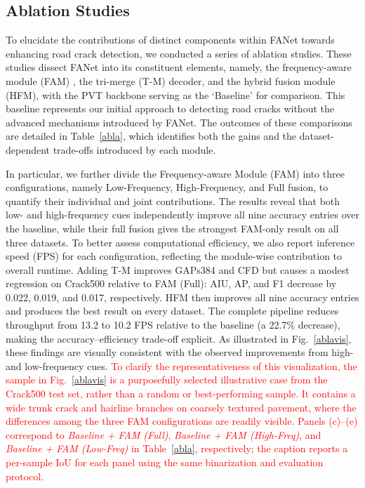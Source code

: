 \documentclass[journal]{IEEEtran}
\begin{document}
\subsection{Ablation Studies}
To elucidate the contributions of distinct components within FANet towards enhancing road crack detection, we conducted a series of ablation studies. These studies dissect FANet into its constituent elements, namely, the frequency-aware module (FAM) , the tri-merge (T-M) decoder, and the hybrid fusion module (HFM), with the PVT backbone serving as the `Baseline’ for comparison. This baseline represents our initial approach to detecting road cracks without the advanced mechanisms introduced by FANet. 
%
The outcomes of these comparisons are detailed in Table~\ref{abla}, which identifies both the gains and the dataset-dependent trade-offs introduced by each module.

In particular, we further divide the Frequency-aware Module (FAM) into three configurations, namely Low-Frequency, High-Frequency, and Full fusion, to quantify their individual and joint contributions.
The results reveal that both low- and high-frequency cues independently improve all nine accuracy entries over the baseline, while their full fusion gives the strongest FAM-only result on all three datasets.
To better assess computational efficiency, we also report inference speed (FPS) for each configuration, reflecting the module-wise contribution to overall runtime.
Adding T-M improves GAPs384 and CFD but causes a modest regression on Crack500 relative to FAM (Full): AIU, AP, and F1 decrease by 0.022, 0.019, and 0.017, respectively. HFM then improves all nine accuracy entries and produces the best result on every dataset. The complete pipeline reduces throughput from 13.2 to 10.2 FPS relative to the baseline (a 22.7\% decrease), making the accuracy--efficiency trade-off explicit.
As illustrated in Fig.~\ref{ablavis}, these findings are visually consistent with the observed improvements from high- and low-frequency cues.
\textcolor{red}{To clarify the representativeness of this visualization, the sample in Fig.~\ref{ablavis} is a purposefully selected illustrative case from the Crack500 test set, rather than a random or best-performing sample. It contains a wide trunk crack and hairline branches on coarsely textured pavement, where the differences among the three FAM configurations are readily visible. Panels (c)--(e) correspond to \emph{Baseline + FAM (Full)}, \emph{Baseline + FAM (High-Freq)}, and \emph{Baseline + FAM (Low-Freq)} in Table~\ref{abla}, respectively; the caption reports a per-sample IoU for each panel using the same binarization and evaluation protocol.}
\end{document}
